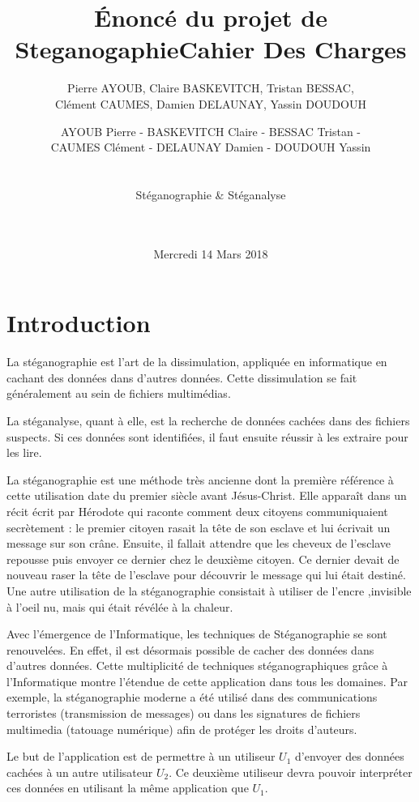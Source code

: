 \documentclass[11pt]{article}
\title{Énoncé du projet de Steganogaphie}
\author{Pierre AYOUB, Claire BASKEVITCH, Tristan BESSAC, \\
Clément CAUMES, Damien DELAUNAY, Yassin DOUDOUH}
\date{Mercredi 14 Mars 2018}
\begin{document}
\title{\Huge{\textbf{Cahier Des Charges}}}
	\author{AYOUB Pierre - BASKEVITCH Claire - BESSAC Tristan - \\
		CAUMES Clément - DELAUNAY Damien - DOUDOUH Yassin \\ \\ \\
		Stéganographie \& Stéganalyse \\ \\ \\}
		

	\begin{titlepage}
		\maketitle
		\vspace{20em}
	\end{titlepage}

\section{Introduction}

La stéganographie est l'art de la dissimulation, appliquée en informatique en
cachant des données dans d'autres données. Cette dissimulation se fait
généralement au sein de fichiers multimédias. 

La stéganalyse, quant à elle, est la recherche de données cachées dans des
fichiers suspects. Si ces données sont identifiées, il faut ensuite réussir à les
extraire pour les lire.

La stéganographie est une méthode très ancienne dont la première référence à cette utilisation date du premier siècle avant Jésus-Christ. 
Elle apparaît dans un récit écrit par Hérodote qui raconte comment deux citoyens communiquaient secrètement : 
le premier citoyen rasait la tête de son esclave et lui écrivait un message sur son crâne. Ensuite, il fallait attendre que les cheveux de l'esclave repousse puis envoyer ce dernier chez le deuxième citoyen. 
Ce dernier devait de nouveau raser la tête de l'esclave pour découvrir le message qui lui était destiné. 
Une autre utilisation de la stéganographie consistait à utiliser de l'encre ,invisible à l'oeil nu, mais qui était révélée à la chaleur. 

Avec l'émergence de l'Informatique, les techniques de Stéganographie se sont renouvelées. En effet, il est désormais possible de cacher des données dans d'autres données. 
Cette multiplicité de techniques stéganographiques grâce à l'Informatique montre l'étendue de cette application dans tous les domaines. 
Par exemple, la stéganographie moderne a été utilisé dans des communications terroristes (transmission de messages) ou dans les signatures de fichiers multimedia (tatouage numérique) afin de protéger les droits d'auteurs. 

Le but de l'application est de permettre à un utiliseur $U_1$ d'envoyer des données cachées à un autre utilisateur $U_2$. Ce deuxième utiliseur devra pouvoir interpréter ces données en utilisant la même application que $U_1$. 
\end{document}
